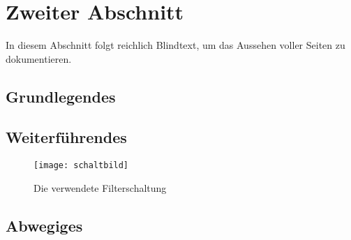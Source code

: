 
\chapter{Zweiter Abschnitt}\label{ch.test}

In diesem Abschnitt folgt reichlich Blindtext, um das Aussehen voller Seiten zu
dokumentieren. 

\section{Grundlegendes}

\begin{neu}
  \blindtext {}
\end{neu}
\blindtext 

\section{Weiterführendes} 

\begin{neu}
  \blindtext
\end{neu}

\blindtext
\blindenumerate
\blindtext[3] 

\begin{figure}[bht]
  \begin{center}
    \texttt{[image: schaltbild]}
    \caption{Die verwendete Filterschaltung}
    \label{fig.Filterschaltung}
  \end{center}
\end{figure}

\blinditemize[8]
\Blindtext[2][2]
\blinddescription {}  

\section{Abwegiges}

\blindtext

